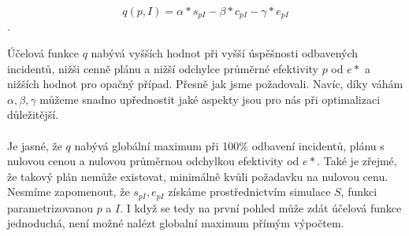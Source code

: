 $$
  q(p, I) = \alpha * s_{pI} - \beta * c_{pI} - \gamma * e_{pI}
$$
.

Účelová funkce $q$ nabývá vyšších hodnot při vyšší úspěšnosti odbavených incidentů, nižši cenně plánu a nižší odchylce průměrné efektivity $p$ od $e*$ a nižších hodnot pro opačný případ.
Přesně jak jsme požadovali.
Navíc, díky váhám $\alpha, \beta, \gamma$ můžeme snadno upřednostit jaké aspekty jsou pro nás při optimalizaci důležitější.
\\
\\
Je jasné, že $q$ nabývá globální maximum při 100\% odbavení incidentů, plánu s nulovou cenou a nulovou průměrnou odchylkou efektivity od $e*$.
Také je zřejmé, že takový plán nemůže existovat, minimálně kvůli požadavku na nulovou cenu.
Nesmíme zapomenout, že $s_{pI}, e_{pI}$ získáme prostřednictvím simulace $S$, funkci parametrizovanou $p$ a $I$.
I když se tedy na první pohled může zdát účelová funkce jednoduchá, není možné nalézt globalní maximum přímým výpočtem.



